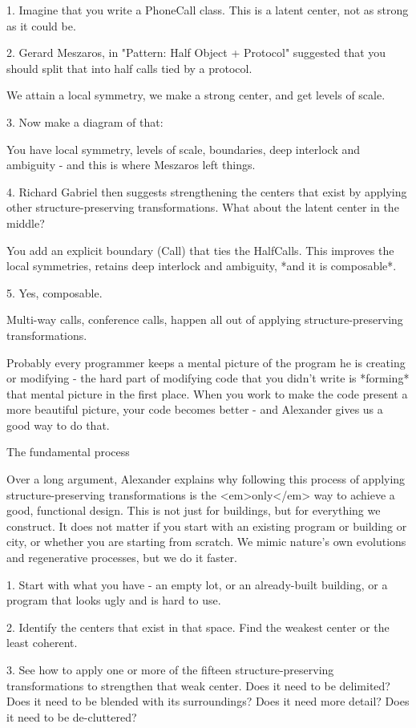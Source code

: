 1. Imagine that you write a PhoneCall class.  This is a latent center, not as strong as it could be.

2. Gerard Meszaros, in "Pattern: Half Object + Protocol" suggested that you should split that into half calls tied by a protocol.

We attain a local symmetry, we make a strong center, and get levels of scale.

3. Now make a diagram of that:

You have local symmetry, levels of scale, boundaries, deep interlock and ambiguity - and this is where Meszaros left things.

4. Richard Gabriel then suggests strengthening the centers that exist by applying other structure-preserving transformations.  What about the latent center in the middle?

You add an explicit boundary (Call) that ties the HalfCalls.  This improves the local symmetries, retains deep interlock and ambiguity, *and it is composable*.

5. Yes, composable.

Multi-way calls, conference calls, happen all out of applying structure-preserving transformations.

Probably every programmer keeps a mental picture of the program he is creating or modifying - the hard part of modifying code that you didn't write is *forming* that mental picture in the first place. When you work to make the code present a more beautiful picture, your code becomes better - and Alexander gives us a good way to do that.

The fundamental process

Over a long argument, Alexander explains why following this process of applying structure-preserving transformations is the <em>only</em> way to achieve a good, functional design.  This is not just for buildings, but for everything we construct.  It does not matter if you start with an existing program or building or city, or whether you are starting from scratch.  We mimic nature's own evolutions and regenerative processes, but we do it faster.

1. Start with what you have - an empty lot, or an already-built building, or a program that looks ugly and is hard to use.

2. Identify the centers that exist in that space.  Find the weakest center or the least coherent.

3. See how to apply one or more of the fifteen structure-preserving transformations to strengthen that weak center.  Does it need to be delimited?  Does it need to be blended with its surroundings?  Does it need more detail?  Does it need to be de-cluttered?

